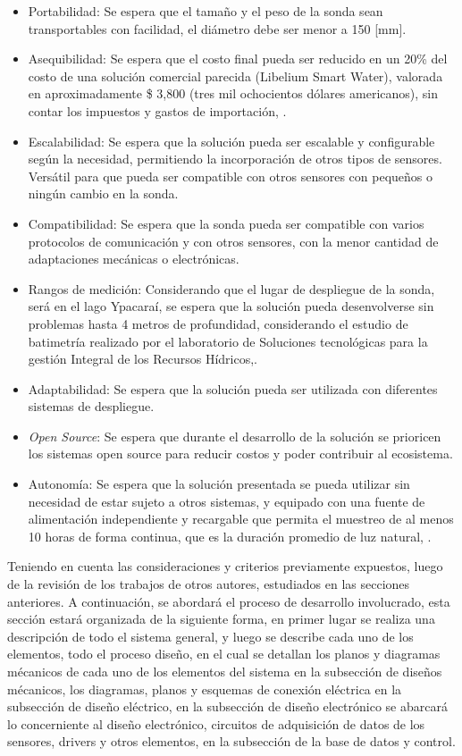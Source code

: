 \begin{itemize}
   \item Portabilidad: Se espera que el tamaño y el peso de la sonda sean transportables con facilidad, el di\'ametro debe ser menor a 150 [mm].
    \item Asequibilidad: Se espera que el costo final pueda ser reducido en un 20\% del costo de una soluci\'on comercial parecida (Libelium Smart Water), valorada en aproximadamente \$ 3,800 (tres mil ochocientos d\'olares americanos), sin contar los impuestos y gastos de importaci\'on, \cite{storeLibelium}.  
    \item Escalabilidad: Se espera que la solución pueda ser escalable y configurable según la necesidad, permitiendo la incorporación de otros tipos de sensores. Vers\'atil para que pueda ser compatible con otros sensores con peque\~nos o ningún cambio en la sonda.
    \item Compatibilidad: Se espera que la sonda pueda ser compatible con varios protocolos de comunicaci\'on y con otros sensores, con la menor cantidad de adaptaciones mec\'anicas o electr\'onicas. 
    \item Rangos de medici\'on: Considerando que el lugar de despliegue de la sonda, ser\'a en el lago Ypacaraí, se espera que la soluci\'on pueda desenvolverse sin problemas hasta 4 metros de profundidad, considerando el estudio de batimetr\'ia realizado por el laboratorio de Soluciones tecnol\'ogicas para la gesti\'on Integral de los Recursos H\'idricos,\cite{itaipu-binacional-2014}.
    \item Adaptabilidad: Se espera que la soluci\'on pueda ser utilizada con diferentes sistemas de despliegue.
    \item \textit{Open Source}: Se espera que durante el desarrollo de la soluci\'on se prioricen los sistemas open source para reducir costos y poder contribuir al ecosistema. 
    \item Autonom\'ia: Se espera que la soluci\'on presentada se pueda utilizar sin necesidad de estar sujeto a otros sistemas, y equipado con una fuente de alimentaci\'on independiente y recargable que permita el muestreo de al menos 10 horas de forma continua, que es la duraci\'on promedio de luz natural, \cite{ClimaSol}. 
\end{itemize}
Teniendo en cuenta las consideraciones y criterios previamente expuestos, luego de la revisi\'on de los trabajos de otros autores, estudiados en las secciones anteriores. A continuaci\'on, se abordar\'a el proceso de desarrollo involucrado, esta secci\'on estará organizada de la siguiente forma, en primer lugar se realiza una descripci\'on de todo el sistema general, y luego se  describe cada uno de los elementos, todo el proceso dise\~no, en el cual se detallan los planos y diagramas m\'ecanicos de cada uno de los elementos del sistema en la subsecci\'on de dise\~nos m\'ecanicos, los diagramas, planos y esquemas de conexi\'on el\'ectrica en la subsecci\'on de dise\~no el\'ectrico, en la subsecci\'on de dise\~no electr\'onico se abarcará lo concerniente al diseño electr\'onico, circuitos de adquisici\'on de datos de los sensores, drivers y otros elementos, en la subsecci\'on de la base de datos y control.
